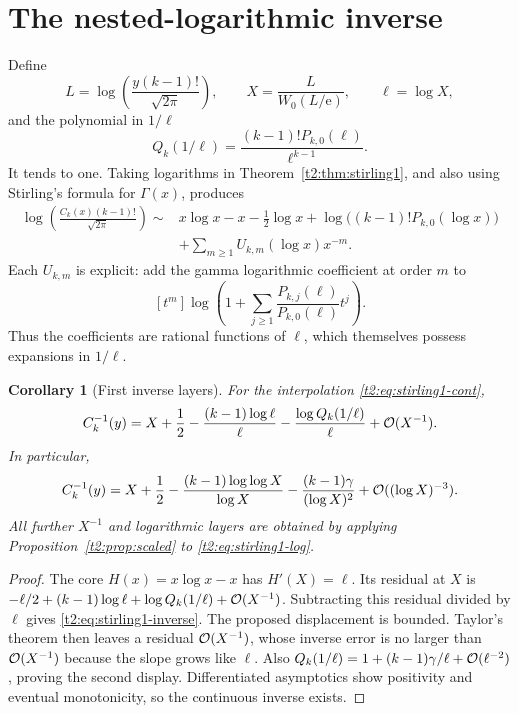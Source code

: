 \documentclass[11pt,openany]{book}
\numberwithin{equation}{chapter}
\theoremstyle{plain}
\newtheorem{corollary}[theorem]{Corollary}
\theoremstyle{definition}
\theoremstyle{remark}
\newcommand{\ee}{\mathrm e}
\begin{document}
\section{The nested-logarithmic inverse}

Define
\begin{equation}
 L=\log\left(\frac{y(k-1)!}{\sqrt{2\pi}}\right),\qquad
 X=\frac{L}{W_0(L/\ee)},\qquad \ell=\log X,
 \label{t2:eq:stirling1-core}
\end{equation}
and the polynomial in $1/\ell$
\begin{equation}
 Q_k(1/\ell)=\frac{(k-1)!P_{k,0}(\ell)}{\ell^{k-1}}.
 \label{t2:eq:stirling1-Q}
\end{equation}
It tends to one. Taking logarithms in Theorem~\ref{t2:thm:stirling1}, and also using Stirling's formula for $\Gamma(x)$, produces
\begin{align}
 \log\left(\frac{C_k(x)(k-1)!}{\sqrt{2\pi}}\right)
 \sim{}&x\log x-x-\tfrac12\log x
       +\log\bigl((k-1)!P_{k,0}(\log x)\bigr)
 \nonumber\\
 &+\sum_{m\ge1}U_{k,m}(\log x)x^{-m}.
 \label{t2:eq:stirling1-log}
\end{align}
Each $U_{k,m}$ is explicit: add the gamma logarithmic coefficient at order $m$ to
\[
 [t^m]\log\left(1+\sum_{j\ge1}
       \frac{P_{k,j}(\ell)}{P_{k,0}(\ell)}t^j\right).
\]
Thus the coefficients are rational functions of $\ell$, which themselves possess expansions in $1/\ell$.

\begin{corollary}[First inverse layers]
\label{t2:cor:stirling1-inverse}
For the interpolation \eqref{t2:eq:stirling1-cont},
\begin{equation}
 C_k^{-1}(y)=X+\frac12
       -\frac{(k-1)\log\ell}{\ell}
       -\frac{\log Q_k(1/\ell)}{\ell}
       +\mathcal O(X^{-1}).
 \label{t2:eq:stirling1-inverse}
\end{equation}
In particular,
\begin{equation}
 C_k^{-1}(y)=X+\frac12-
       \frac{(k-1)\log\log X}{\log X}
       -\frac{(k-1)\gamma}{(\log X)^2}
       +\mathcal O((\log X)^{-3}).
 \label{t2:eq:stirling1-inverse-expanded}
\end{equation}
All further $X^{-1}$ and logarithmic layers are obtained by applying Proposition~\ref{t2:prop:scaled} to \eqref{t2:eq:stirling1-log}.
\end{corollary}
\begin{proof}
The core $H(x)=x\log x-x$ has $H'(X)=\ell$. Its residual at $X$ is
$-\ell/2+(k-1)\log\ell+\log Q_k(1/\ell)+\mathcal O(X^{-1})$.
Subtracting this residual divided by $\ell$ gives \eqref{t2:eq:stirling1-inverse}. The proposed displacement is bounded. Taylor's theorem then leaves a residual $\mathcal O(X^{-1})$, whose inverse error is no larger than $\mathcal O(X^{-1})$ because the slope grows like $\ell$. Also
$Q_k(1/\ell)=1+(k-1)\gamma/\ell+\mathcal O(\ell^{-2})$, proving the second display. Differentiated asymptotics show positivity and eventual monotonicity, so the continuous inverse exists.
\end{proof}
\end{document}
